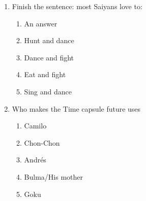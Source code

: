 \documentclass[letterpaper,addpoints,answers,twocolumn,10pt]{exam}
\begin{document}
\begin{enumerate}[leftmargin=.2in]
\begin{enumerate}[noitemsep,leftmargin=0in]
\end{enumerate}



\item  Finish the sentence: most Saiyans love to:


\begin{enumerate}[noitemsep,leftmargin=0in]


\item  An answer
\item  Hunt and dance
\item  Dance and fight
\item  Eat and fight
\item  Sing and dance


\end{enumerate}



\item  Who makes the Time capsule future uses


\begin{enumerate}[noitemsep,leftmargin=0in]


\item  Camilo
\item  Chon-Chon
\item  Andrés
\item  Bulma/His mother
\item  Goku


\end{enumerate}



\end{enumerate}
\end{document}
